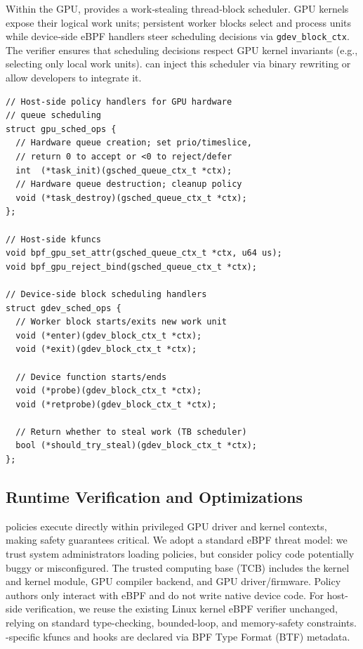 Within the GPU, \sys provides a work‑stealing thread‑block scheduler. GPU kernels expose their logical work units; persistent worker blocks select and process units while device‑side eBPF handlers steer scheduling decisions via \texttt{gdev\_block\_ctx}. The verifier ensures that scheduling decisions respect GPU kernel invariants (e.g., selecting only local work units). \sys can inject this scheduler via binary rewriting or allow developers to integrate it.

\begin{lstlisting}
// Host-side policy handlers for GPU hardware
// queue scheduling
struct gpu_sched_ops {
  // Hardware queue creation; set prio/timeslice,
  // return 0 to accept or <0 to reject/defer
  int  (*task_init)(gsched_queue_ctx_t *ctx);
  // Hardware queue destruction; cleanup policy
  void (*task_destroy)(gsched_queue_ctx_t *ctx);
};

// Host-side kfuncs
void bpf_gpu_set_attr(gsched_queue_ctx_t *ctx, u64 us);
void bpf_gpu_reject_bind(gsched_queue_ctx_t *ctx);

// Device-side block scheduling handlers
struct gdev_sched_ops {
  // Worker block starts/exits new work unit
  void (*enter)(gdev_block_ctx_t *ctx);
  void (*exit)(gdev_block_ctx_t *ctx);

  // Device function starts/ends
  void (*probe)(gdev_block_ctx_t *ctx);
  void (*retprobe)(gdev_block_ctx_t *ctx);

  // Return whether to steal work (TB scheduler)
  bool (*should_try_steal)(gdev_block_ctx_t *ctx);
};
\end{lstlisting}

\subsection{Runtime Verification and Optimizations}
\label{sec:verification}

\sys policies execute directly within privileged GPU driver and kernel contexts, making safety guarantees critical. We adopt a standard eBPF threat model: we trust system administrators loading policies, but consider policy code potentially buggy or misconfigured. The trusted computing base (TCB) includes the kernel and \sys kernel module, GPU compiler backend, and GPU driver/firmware. Policy authors only interact with eBPF and do not write native device code. For host-side verification, we reuse the existing Linux kernel eBPF verifier unchanged, relying on standard type-checking, bounded-loop, and memory-safety constraints. \sys-specific kfuncs and hooks are declared via BPF Type Format (BTF) metadata.

